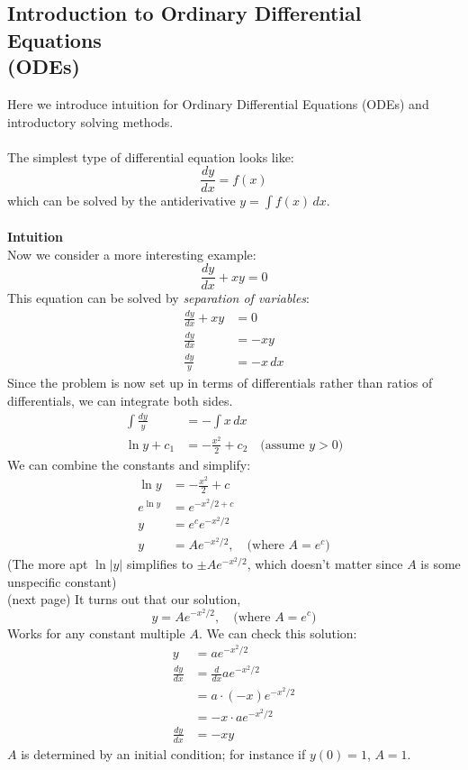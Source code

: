 \documentclass{report}
\begin{document}
\subsection{Introduction to Ordinary Differential Equations\\(ODEs)} %
Here we introduce intuition for  Ordinary Differential Equations (ODEs) and introductory solving methods.\\
\vspace{1mm}\\
The simplest type of differential equation looks like:
\begin{equation*}
\frac{dy}{dx}=f(x)
\end{equation*}
which can be solved by the antiderivative $y=\int f(x)\,dx$. \\
\vspace{1mm}\\
\textbf{Intuition}\\
Now we consider a more interesting example: 
\begin{equation*}
\frac{dy}{dx}+xy=0
\end{equation*}
This equation can be solved by \textit{separation of variables}:
\begin{align*}
\frac{dy}{dx}+xy&=0\\
\frac{dy}{dx}&=-xy\\
\frac{dy}{y}&=-x\,dx
\end{align*}
Since the problem is now set up in terms of differentials rather than ratios of differentials,
we can integrate both sides.
\begin{align*}
\int\frac{dy}{y}&=-\int x\,dx\\
\ln y+c_1&=-\frac{x^2}{2}+c_2\quad\text{(assume $y>0$)}
\end{align*}
We can combine the constants and simplify:
\begin{align*}
\ln y&=-\frac{x^2}{2}+c\\
e^{\ln y}&=e^{-x^2/2+c}\\
y&=e^ce^{-x^2/2}\\
y&=Ae^{-x^2/2},\quad\text{(where $A=e^c$})
\end{align*}
(The more apt $\ln|y|$ simplifies to $\pm Ae^{-x^2/2}$, which doesn't matter since $A$ is some
unspecific constant)\\
(next page)
\newpage
\noindent It turns out that our solution,
\begin{equation*}
y=Ae^{-x^2/2},\quad\text{(where $A=e^c$})
\end{equation*}
Works for any constant multiple $A$. We can check this 
solution:
\begin{align*}
y&=ae^{-x^2/2}\\
\frac{dy}{dx}&=\frac{d}{dx}ae^{-x^2/2}\\
&=a\cdot(-x)e^{-x^2/2}\\
&=-x\cdot ae^{-x^2/2}\\
\frac{dy}{dx}&=-xy
\end{align*}
$A$ is determined by an initial condition; for instance if $y(0)=1$, $A=1$.
\newpage
\end{document}
